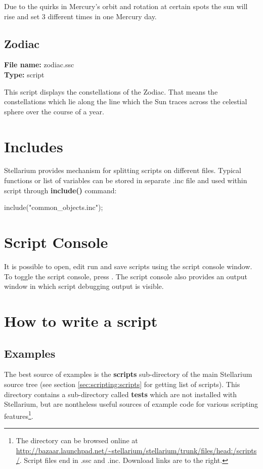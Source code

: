 Due to the quirks in Mercury's orbit and rotation at certain spots the sun will rise and set 3 different times in one Mercury day.

\subsection{Zodiac}
\textbf{File name:} zodiac.ssc \\
\textbf{Type:} script

This script displays the constellations of the Zodiac. That means the constellations which lie along the line which the Sun traces across the celestial sphere over the course of a year.

\section{Includes}
\label{sec:scripting:includes}

Stellarium provides mechanism for splitting scripts on different files. Typical functions or list of variables can be stored in separate .inc file and used within script through \textbf{include()} command:
\begin{script}
include("common_objects.inc");
\end{script}

\section{Script Console}
\label{sec:scripting:console}
It is possible to open, edit run and save scripts using the script console window. To toggle the script console, press . The script console also provides an output window in which script debugging output is visible.

\section{How to write a script}
\label{sec:scripting:HowToWriteScript}

\subsection{Examples}
\label{sec:scripting:examples}
The best source of examples is the \textbf{scripts} sub-directory of the main Stellarium source tree (see section \ref{sec:scripting:scripts} for getting list of scripts). This directory contains a sub-directory called \textbf{tests} which are not installed with Stellarium, but are nontheless useful sources of example code for various scripting features\footnote{The directory can be browsed online at \url{http://bazaar.launchpad.net/~stellarium/stellarium/trunk/files/head:/scripts/}. Script files end in .ssc and .inc. Download links are to the right.}.

